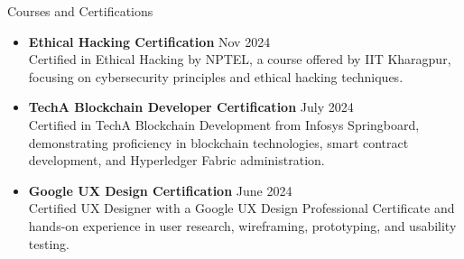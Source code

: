 \documentclass{resume} %
\begin{document}
\begin{rSection}{Courses and Certifications}
    \begin{itemize}

        \item \textbf{Ethical Hacking Certification} \hfill Nov 2024\\
        Certified in Ethical Hacking by NPTEL, a course offered by IIT Kharagpur, focusing on cybersecurity principles and ethical hacking techniques.
              

        \item \textbf{TechA Blockchain Developer Certification} \hfill July 2024\\
              Certified in TechA Blockchain Development from Infosys Springboard, demonstrating proficiency in blockchain technologies, smart contract development, and Hyperledger Fabric administration.

              \item \textbf{Google UX Design Certification} \hfill June 2024\\
              Certified UX Designer with a Google UX Design Professional Certificate and hands-on experience in user research, wireframing, prototyping, and usability testing. 




\end{itemize}
\end{rSection}
\end{document}
